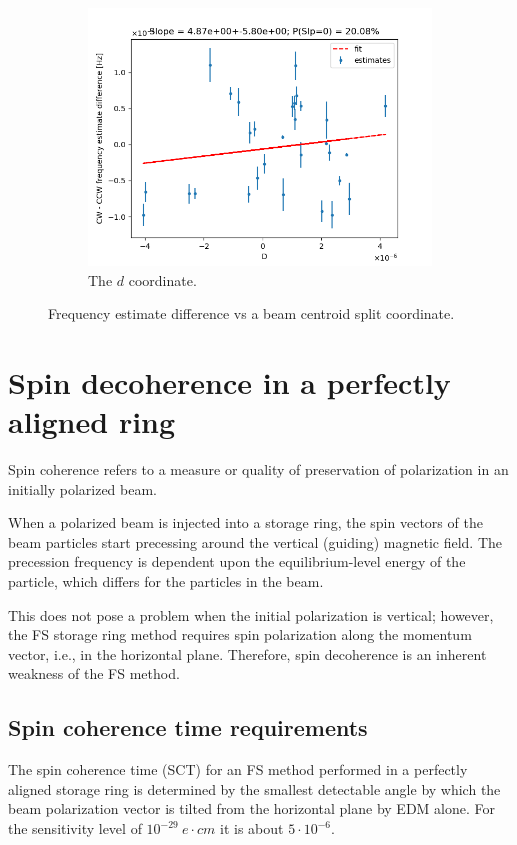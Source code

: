 \documentclass{article}
\begin{document}
\begin{figure}[!h]\ContinuedFloat
  \centering
  \begin{subfigure}[b]{\linewidth}
    \includegraphics[width=\linewidth]{img/spin_axis_motion/multiple/freq_estimates_vs_centroid_diff_D}
    \caption{The $d$ coordinate.}
  \end{subfigure}
  \caption{Frequency estimate difference vs a beam centroid split coordinate.\label{fig:BiasVsCentroid}}
\end{figure}

\section{Spin decoherence in a perfectly aligned ring}
Spin coherence refers to a measure or quality of preservation of polarization in an initially polarized beam.~\citep[p.~205]{Eremey:Thesis}

When a polarized beam is injected into a storage ring, the spin vectors of the beam particles start precessing around the vertical (guiding) magnetic field. The precession frequency is dependent upon the equilibrium-level energy of the particle, which differs for the particles in the beam.

This does not pose a problem when the initial polarization is vertical; however, the FS storage ring method requires spin polarization along the momentum vector, i.e., in the horizontal plane. Therefore, spin decoherence is an inherent weakness of the FS method.

\subsection{Spin coherence time requirements}
The spin coherence time (SCT) for an FS method performed in a perfectly aligned storage ring is determined by the smallest detectable angle by which the beam polarization vector is tilted from the horizontal plane by EDM alone. For the sensitivity level of $10^{-29}~e\cdot cm$ it is about $5\cdot10^{-6}$.~\cite{BNL:Deuteron2008}
\end{document}
